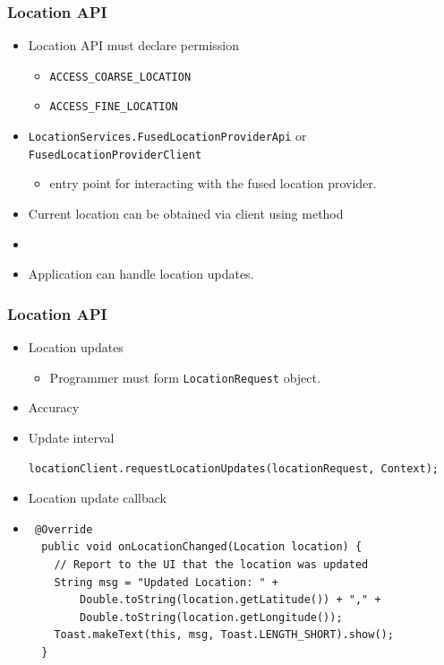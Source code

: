 \documentclass[10pt,xcolor=pdflatex]{beamer}
\begin{document}
\begin{frame}[fragile]\frametitle{Location API}
\begin{itemize}
	\item Location API must declare permission
	  \begin{itemize}
		\item \texttt{ACCESS\_COARSE\_LOCATION}
		\item \texttt{ACCESS\_FINE\_LOCATION}
	  \end{itemize}
	\item \texttt{LocationServices.FusedLocationProviderApi} \newline or
	      \texttt{FusedLocationProviderClient}
      \begin{itemize}
        \item entry point for interacting with the fused location provider.
      \end{itemize}
	\item Current location can be obtained via client using method
    \item[] \begin{footnotesize}
      \end{footnotesize}
    \item Application can handle location updates.
\end{itemize}
\end{frame}


\begin{frame}[fragile]\frametitle{Location API}
\begin{itemize}
	\item Location updates
	  \begin{itemize}
		\item Programmer must form \texttt{LocationRequest} object.
	  \end{itemize}
    \item Accuracy
	\item Update interval \newline \begin{footnotesize}\verb|locationClient.requestLocationUpdates(locationRequest, Context);|\end{footnotesize}
    \item Location update callback
    \item[] 
	\lstset{language=XML, basicstyle=\footnotesize\ttfamily}
    \begin{lstlisting}
 @Override
  public void onLocationChanged(Location location) {
    // Report to the UI that the location was updated
    String msg = "Updated Location: " +
        Double.toString(location.getLatitude()) + "," +
        Double.toString(location.getLongitude());
    Toast.makeText(this, msg, Toast.LENGTH_SHORT).show();
  }
    \end{lstlisting}    
\end{itemize}
\end{frame}
\end{document}
